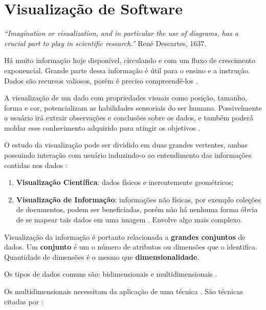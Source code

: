 \chapter{Visualização de Software}

\textit{``Imagination or visualization, and in particular the use of diagrams,
has a crucial part to play in scientific research.''} René Descartes, 1637.

Há muito informação hoje disponível, circulando e com um fluxo de crescimento
exponencial. Grande parte dessa informação é útil para o ensino e a instrução.
Dados são recursos valiosos, porém é preciso compreendê-los \cite{messias2012}.

A visualização de um dado com propriedades visuais como posição, tamanho, forma
e cor, potencializam as habilidades sensoriais do ser humano. Possivelmente o usuário
irá extrair observações e conclusões sobre os dados, e também poderá moldar esse
conhecimento adquirido para atingir os objetivos \cite{card1999readings}
\cite{heer2012interactive} \cite{keim2002information}.

O estudo da visualização pode ser dividido em duas grandes vertentes, ambas
possuindo interação com usuário induzindo-o ao entendimento das informações
contidas nos dados \cite{de2003visual}:

\begin{enumerate}
  \item \textbf{Visualização Científica}: dados físicos e inerentemente
  geométricos;
  \item \textbf{Visualização de Informação}: informações não físicas, por
  exemplo coleções de documentos, podem ser beneficiadas, porém não há nenhuma
  forma óbvia de se mapear tais dados em uma imagem \cite{card1999readings}.
  Envolve algo mais complexo.
\end{enumerate}

Visualização da informação é portanto relacionada a \textbf{grandes conjuntos}
de dados. Um \textbf{conjunto} é um o número de atributos ou dimensões que o
identifica. Quantidade de dimensões é o mesmo que \textbf{dimensionalidade}.

Os tipos de dados comuns são: bidimensionais e multidimensionais
\cite{de2003visual}.

Os multidimensionais necessitam da aplicação de uma técnica
\cite{keim2002information}. São técnicas citadas por :

